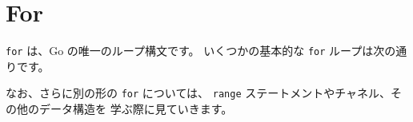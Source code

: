 \section{For}

\texttt{for} は、Go の唯一のループ構文です。 いくつかの基本的な \texttt{for} ループは次の通りです。




なお、さらに別の形の \texttt{for} については、 \texttt{range} ステートメントやチャネル、その他のデータ構造を 学ぶ際に見ていきます。